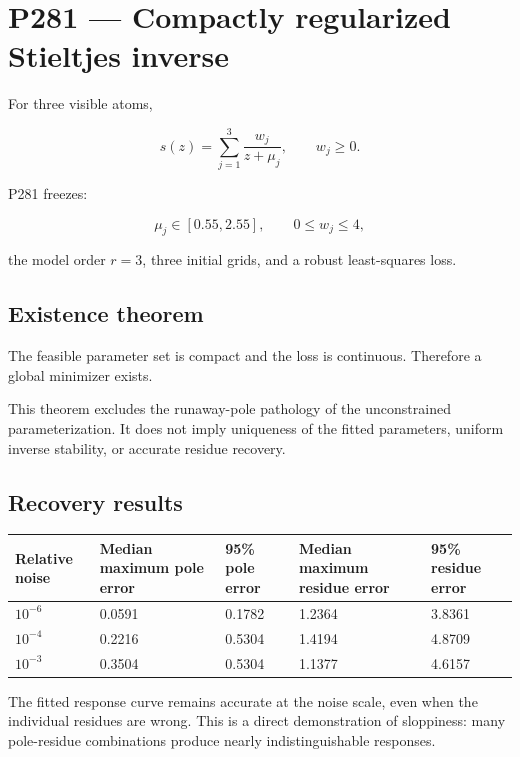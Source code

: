 \documentclass[11pt,a4paper,openany]{report}
\begin{document}
\chapter{P281 --- Compactly regularized Stieltjes inverse}

For three visible atoms,

\[
s(z)=\sum_{j=1}^{3}\frac{w_j}{z+\mu_j},
\qquad
w_j\ge0.
\]

P281 freezes:

\[
\mu_j\in[0.55,2.55],
\qquad
0\le w_j\le4,
\]

the model order \(r=3\), three initial grids, and a robust least-squares loss.

\section{Existence theorem}

The feasible parameter set is compact and the loss is continuous. Therefore a global minimizer exists.

This theorem excludes the runaway-pole pathology of the unconstrained parameterization. It does not imply uniqueness of the fitted parameters, uniform inverse stability, or accurate residue recovery.

\section{Recovery results}

\begin{center}
\begingroup\fontsize{7}{8.4}\selectfont
\setlength{\tabcolsep}{2.5pt}
\renewcommand{\arraystretch}{1.16}
\begin{longtable}{@{}p{}p{}p{}p{}p{}@{}}
\toprule
\textbf{Relative noise} & \textbf{Median maximum pole error} & \textbf{95\% pole error} & \textbf{Median maximum residue error} & \textbf{95\% residue error} \\
\midrule
\endhead
\(10^{-6}\) & 0.0591 & 0.1782 & 1.2364 & 3.8361 \\
\(10^{-4}\) & 0.2216 & 0.5304 & 1.4194 & 4.8709 \\
\(10^{-3}\) & 0.3504 & 0.5304 & 1.1377 & 4.6157 \\
\bottomrule
\end{longtable}
\endgroup
\end{center}

The fitted response curve remains accurate at the noise scale, even when the individual residues are wrong. This is a direct demonstration of sloppiness: many pole-residue combinations produce nearly indistinguishable responses.
\end{document}
